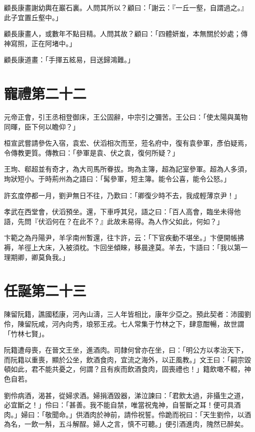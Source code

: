 顧長康畫謝幼輿在巖石裏。人問其所以？顧曰：「謝云：『一丘一壑，自謂過之。』此子宜置丘壑中。」

顧長康畫人，或數年不點目精。人問其故？顧曰：「四體妍蚩，本無關於妙處；傳神寫照，正在阿堵中。」

顧長康道畫：「手揮五絃易，目送歸鴻難。」



\chapter{寵禮第二十二}

元帝正會，引王丞相登御床，王公固辭，中宗引之彌苦。王公曰：「使太陽與萬物同暉，臣下何以瞻仰？」

桓宣武嘗請參佐入宿，袁宏、伏滔相次而至，蒞名府中，復有袁參軍，彥伯疑焉，令傳教更質。傳教曰：「參軍是袁、伏之袁，復何所疑？」

王珣、郗超並有奇才，為大司馬所眷拔。珣為主簿，超為記室參軍。超為人多須，珣狀短小。于時荊州為之語曰：「髯參軍，短主簿。能令公喜，能令公怒。」

許玄度停都一月，劉尹無日不往，乃歎曰：「卿復少時不去，我成輕薄京尹！」

孝武在西堂會，伏滔預坐。還，下車呼其兒，語之曰：「百人高會，臨坐未得他語，先問『伏滔何在？在此不？』此故未易得。為人作父如此，何如？」

卞範之為丹陽尹，羊孚南州暫還，往卞許，云：「下官疾動不堪坐。」卞便開帳拂褥，羊徑上大床，入被須枕。卞回坐傾睞，移晨達莫。羊去，卞語曰：「我以第一理期卿，卿莫負我。」



\chapter{任誕第二十三}

陳留阮籍，譙國嵇康，河內山濤，三人年皆相比，康年少亞之。預此契者：沛國劉伶，陳留阮咸，河內向秀，琅邪王戎。七人常集于竹林之下，肆意酣暢，故世謂「竹林七賢」。

阮籍遭母喪，在晉文王坐，進酒肉。司隸何曾亦在坐，曰：「明公方以孝治天下，而阮籍以重喪，顯於公坐，飲酒食肉，宜流之海外，以正風教。」文王曰：「嗣宗毀頓如此，君不能共憂之，何謂？且有疾而飲酒食肉，固喪禮也！」籍飲噉不輟，神色自若。

劉伶病酒，渴甚，從婦求酒。婦捐酒毀器，涕泣諫曰：「君飲太過，非攝生之道，必宜斷之！」伶曰：「甚善。我不能自禁，唯當祝鬼神，自誓斷之耳！便可具酒肉。」婦曰：「敬聞命。」供酒肉於神前，請伶祝誓。伶跪而祝曰：「天生劉伶，以酒為名，一飲一斛，五斗解酲。婦人之言，慎不可聽。」便引酒進肉，隗然已醉矣。

